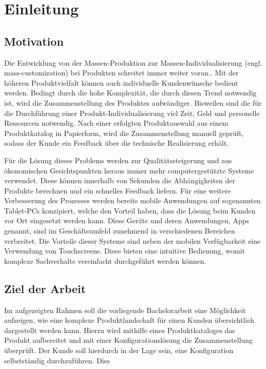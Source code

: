 \chapter{Einleitung}
\section{Motivation} \label{aufgaben}
Die Entwicklung von der Massen-Produktion zur Massen-Individualisierung (engl. mass-customization) bei Produkten schreitet immer weiter voran.\cite{bib:massCustomization}. Mit der höheren Produktvielfalt können auch individuelle Kundenwünsche bedient werden. Bedingt durch die hohe Komplexität, die durch diesen Trend notwendig ist, wird die Zusammenstellung des Produktes aufwändiger. Bisweilen sind die für die Durchführung einer Produkt-Individualisierung viel Zeit, Geld und personelle Ressourcen notwendig.
Nach einer erfolgten Produktauswahl aus einem Produktkatalog in Papierform, wird die Zusammenstellung manuell geprüft, sodass der Kunde ein Feedback über die technische Realisierung erhält. \par

Für die Lösung dieses Problems werden zur Qualitätssteigerung und aus ökonomischen Gesichtspunkten heraus immer mehr computergestützte Systeme verwendet. Diese können innerhalb von Sekunden die Abhängigkeiten der Produkte berechnen und ein schnelles Feedback liefern. Für eine weitere Verbesserung des Prozesses werden bereits mobile Anwendungen auf sogenannten Tablet-PCs konzipiert, welche den Vorteil haben, dass die Lösung beim Kunden vor Ort eingesetzt werden kann. Diese Geräte und deren Anwendungen, Apps genannt, sind im Geschäftsumfeld zunehmend in verschiedenen Bereichen verbreitet\cite{bib:businessApps}. Die Vorteile dieser Systeme sind neben der mobilen Verfügbarkeit eine Verwendung von Touchscreens. Diese bieten eine intuitive Bedienung, womit komplexe Sachverhalte vereinfacht durchgeführt werden können.
 
\section{Ziel der Arbeit} \label{goal}
Im aufgezeigten Rahmen soll die vorliegende Bachelorarbeit eine Möglichkeit aufzeigen, wie eine komplexe Produktlandschaft für einen Kunden übersichtlich dargestellt werden kann. Hierzu wird mithilfe eines Produktkataloges das Produkt aufbereitet und mit einer Konfigurationslösung die Zusammenstellung überprüft. Der Kunde soll hierdurch in der Lage sein, eine Konfiguration selbstständig durchzuführen. Dies

